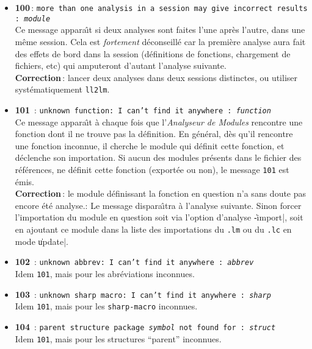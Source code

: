 \begin{itemize}
\item {\Large {\bf 100}}\,: {\tt  more than one analysis in a session may
give incorrect results : {\em module}} \\
Ce message appara\^{\i}t si deux analyses sont faites l'une apr\`{e}s
l'autre, dans une m\^{e}me session. Cela est {\it fortement}
d\'{e}conseill\'{e} car la premi\`{e}re analyse aura fait des effets de bord
dans la session (d\'{e}finitions de fonctions, chargement de fichiers,
etc) qui amputeront d'autant l'analyse suivante. \\
{\bf Correction}\,: lancer deux analyses dans deux sessions distinctes,
ou utiliser syst\'{e}matiquement {\tt ll2lm}.

\item {\Large {\bf 101}}\ : {\tt unknown function: I can't find it anywhere
: {\em function}}\\
Ce message appara\^{\i}t \`{a} chaque fois que l'{\em Analyseur de Modules}
rencontre une fonction dont il ne trouve pas la d\'{e}finition. En
g\'{e}n\'{e}ral, d\`{e}s qu'il rencontre une fonction inconnue, il  
cherche le module qui d\'{e}finit cette fonction, et d\'{e}clenche son
importation. Si aucun des modules pr\'{e}sents dans le fichier des
r\'{e}f\'{e}rences, ne d\'{e}finit cette fonction (export\'{e}e ou non), le message
{\tt 101} est \'{e}mis. \\
{\bf Correction}\,: le module d\'{e}finissant la
fonction en question n'a sans doute pas encore \'{e}t\'{e} analyse.: Le message
dispara\^{\i}tra \`{a} l'analyse suivante. Sinon forcer l'importation du
module en question soit via l'option d'analyse \|-import|, soit en
ajoutant ce module dans la liste des importations du {\tt .lm} ou du
{\tt .lc} en mode \|update|.

\item {\Large {\bf 102}}\ : {\tt  unknown abbrev: I can't find it anywhere :
{\em abbrev} }\\
Idem {\tt 101}, mais pour les abr\'{e}viations inconnues.

\item {\Large {\bf 103}}\ : {\tt unknown sharp macro: I can't find it
anywhere : {\em sharp}}\\
Idem {\tt 101}, mais pour les {\tt sharp-macro} inconnues.

\item {\Large {\bf 104}}\ : {\tt parent structure package {\em symbol} not found
for : {\em struct}}\\
Idem {\tt 101}, mais pour les structures ``parent{''} inconnues.


\end{itemize}
